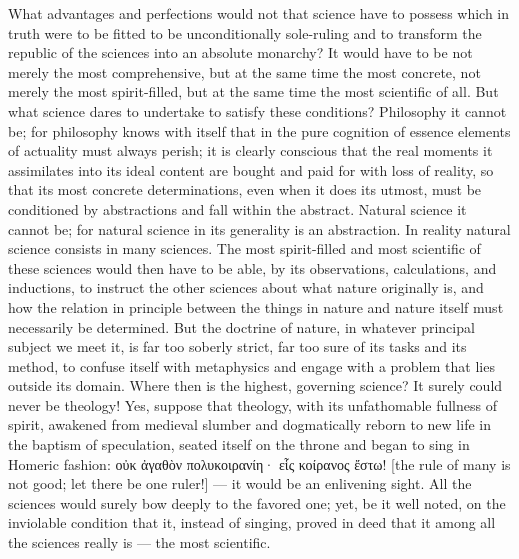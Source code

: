 \documentclass[12pt]{book}
\begin{document}
What advantages and perfections would not that science have to possess which in
truth were to be fitted to be unconditionally sole-ruling and to transform the
republic of the sciences into an absolute monarchy? It would have to be not
merely the most comprehensive, but at the same time the most concrete, not merely
the most spirit-filled, but at the same time the most scientific of all. But what
science dares to undertake to satisfy these conditions? Philosophy it cannot be;
for philosophy knows with itself that in the pure cognition of essence elements
of actuality must always perish; it is clearly conscious that the real moments it
assimilates into its ideal content are bought and paid for with loss of reality,
so that its most concrete determinations, even when it does its utmost, must be
conditioned by abstractions and fall within the abstract. Natural science it
cannot be; for natural science in its generality is an abstraction. In reality
natural science consists in many sciences. The most spirit-filled and most
scientific of these sciences would then have to be able, by its observations,
calculations, and inductions, to instruct the other sciences about what nature
originally is, and how the relation in principle between the things in nature and
nature itself must necessarily be determined. But the doctrine of nature, in
whatever principal subject we meet it, is far too soberly strict, far too sure of
its tasks and its method, to confuse itself with metaphysics and engage with a
problem that lies outside its domain. Where then is the highest, governing
science? It surely could never be theology! Yes, suppose that theology, with its
unfathomable fullness of spirit, awakened from medieval slumber and dogmatically
reborn to new life in the baptism of speculation, seated itself on the throne and
began to sing in Homeric fashion: οὐκ ἀγαθὸν πολυκοιρανίη· εἷς
κοίρανος ἔστω! [the rule of many is not good; let there be one ruler!] --- it
would be an enlivening sight. All the sciences would surely bow deeply to the
favored one; yet, be it well noted, on the inviolable condition that it, instead
of singing, proved in deed that it among all the sciences really is --- the most
scientific.
\end{document}
